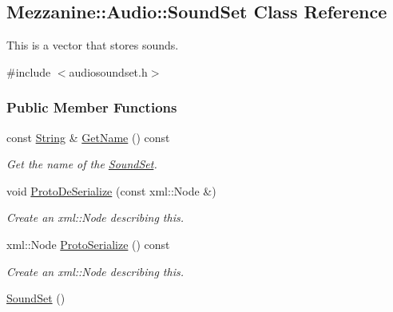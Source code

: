\hypertarget{classMezzanine_1_1Audio_1_1SoundSet}{
\subsection{Mezzanine::Audio::SoundSet Class Reference}
\label{classMezzanine_1_1Audio_1_1SoundSet}
}


This is a vector that stores sounds.  




{\ttfamily \#include $<$audiosoundset.h$>$}

\subsubsection*{Public Member Functions}
\begin{DoxyCompactItemize}
\item 
const \hyperlink{namespaceMezzanine_acf9fcc130e6ebf08e3d8491aebcf1c86}{String} \& \hyperlink{classMezzanine_1_1Audio_1_1SoundSet_a98db3c1de2ec5aa26bfdb990df0a8de5}{GetName} () const 
\begin{DoxyCompactList}\small\item\em Get the name of the \hyperlink{classMezzanine_1_1Audio_1_1SoundSet}{SoundSet}. \item\end{DoxyCompactList}\item 
void \hyperlink{classMezzanine_1_1Audio_1_1SoundSet_adc57b4e4b9618f481b99d4df42fed9fa}{ProtoDeSerialize} (const xml::Node \&)
\begin{DoxyCompactList}\small\item\em Create an xml::Node describing this. \item\end{DoxyCompactList}\item 
xml::Node \hyperlink{classMezzanine_1_1Audio_1_1SoundSet_a6eb7cfc0fc2ee768fd9df36ede43d740}{ProtoSerialize} () const 
\begin{DoxyCompactList}\small\item\em Create an xml::Node describing this. \item\end{DoxyCompactList}\item 
\hypertarget{classMezzanine_1_1Audio_1_1SoundSet_aa0a7e1e9f16d3bd264737b02b2e489cf}{
\hyperlink{classMezzanine_1_1Audio_1_1SoundSet_aa0a7e1e9f16d3bd264737b02b2e489cf}{SoundSet} ()}
\label{classMezzanine_1_1Audio_1_1SoundSet_aa0a7e1e9f16d3bd264737b02b2e489cf}


\end{DoxyCompactItemize}
